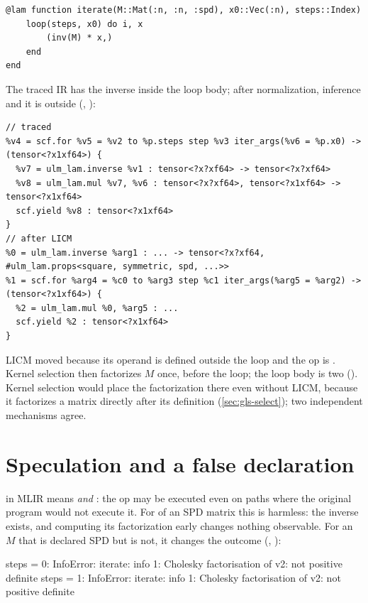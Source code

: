 \begin{lstlisting}[style=jl]
@lam function iterate(M::Mat(:n, :n, :spd), x0::Vec(:n), steps::Index)
    loop(steps, x0) do i, x
        (inv(M) * x,)
    end
end
\end{lstlisting}

The traced IR has the inverse inside the loop body; after normalization,
inference and  it is outside
(, ):

\begin{lstlisting}
// traced
%v4 = scf.for %v5 = %v2 to %p.steps step %v3 iter_args(%v6 = %p.x0) -> (tensor<?x1xf64>) {
  %v7 = ulm_lam.inverse %v1 : tensor<?x?xf64> -> tensor<?x?xf64>
  %v8 = ulm_lam.mul %v7, %v6 : tensor<?x?xf64>, tensor<?x1xf64> -> tensor<?x1xf64>
  scf.yield %v8 : tensor<?x1xf64>
}
// after LICM
%0 = ulm_lam.inverse %arg1 : ... -> tensor<?x?xf64, #ulm_lam.props<square, symmetric, spd, ...>>
%1 = scf.for %arg4 = %c0 to %arg3 step %c1 iter_args(%arg5 = %arg2) -> (tensor<?x1xf64>) {
  %2 = ulm_lam.mul %0, %arg5 : ...
  scf.yield %2 : tensor<?x1xf64>
}
\end{lstlisting}

LICM moved  because its operand is defined outside the loop
and the op is . Kernel selection then factorizes \(M\) once,
before the loop; the loop body is two 
(). Kernel selection would place the
factorization there even without LICM, because it factorizes a matrix
directly after its definition (\cref{sec:gls-select}); two independent
mechanisms agree.

\section{Speculation and a false declaration}
\label{sec:effects-speculation}

 in MLIR means  \emph{and}
: the op may be executed even on paths where the
original program would not execute it. For  of an SPD
matrix this is harmless: the inverse exists, and computing its
factorization early changes nothing observable. For an \(M\) that is
declared SPD but is not, it changes the outcome
(, ):

\begin{textout}
steps = 0: InfoError: iterate: info 1: Cholesky factorisation of v2: not positive definite
steps = 1: InfoError: iterate: info 1: Cholesky factorisation of v2: not positive definite
\end{textout}

